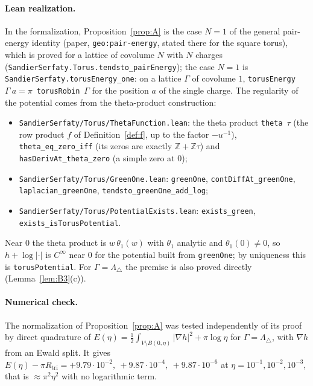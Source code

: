 \documentclass[11pt]{article}
\theoremstyle{definition}
\theoremstyle{remark}
\newcommand{\Z}{\mathbb Z}
\newcommand{\Ltri}{\Lambda_{\triangle}}
\newcommand{\lean}[1]{\texttt{#1}}
\begin{document}
\paragraph{Lean realization.} In the formalization, Proposition~\ref{prop:A} is the case $N=1$ of the general
pair-energy identity (paper, \texttt{geo:pair-energy}, stated there for the square torus), which is proved for a
lattice of covolume $N$ with $N$ charges (\lean{SandierSerfaty.Torus.tendsto\_pairEnergy}); the case $N=1$ is
\lean{SandierSerfaty.torusEnergy\_one}: on a lattice $\Gamma$ of covolume $1$, \lean{torusEnergy}\ $\Gamma\ a=\pi\,$%
\lean{torusRobin}\ $\Gamma$ for the position $a$ of the single charge. The regularity of the potential
comes from the theta-product construction:
\begin{itemize}
\item \lean{SandierSerfaty/Torus/ThetaFunction.lean}: the theta product \lean{theta}\ $\tau$ (the row
product $f$ of Definition~\ref{def:f}, up to the factor $-u^{-1}$), \lean{theta\_eq\_zero\_iff} (its zeros
are exactly $\Z+\Z\tau$) and \lean{hasDerivAt\_theta\_zero} (a simple zero at $0$);
\item \lean{SandierSerfaty/Torus/GreenOne.lean}: \lean{greenOne}, \lean{contDiffAt\_greenOne},
\lean{laplacian\_greenOne}, \lean{tendsto\_greenOne\_add\_log};
\item \lean{SandierSerfaty/Torus/PotentialExists.lean}: \lean{exists\_green},
\lean{exists\_isTorusPotential}.
\end{itemize}
Near $0$ the theta product is $w\,\theta_1(w)$ with $\theta_1$ analytic and $\theta_1(0)\ne0$, so $h+\log|\cdot|$ is
$C^\infty$ near $0$ for the potential built from \lean{greenOne}; by uniqueness this is
\lean{torusPotential}. For $\Gamma=\Ltri$ the premise is also proved directly (Lemma~\ref{lem:B3}(c)).

\paragraph{Numerical check.} The normalization of Proposition~\ref{prop:A} was
tested independently of its proof by direct quadrature of
$E(\eta)=\tfrac12\int_{V\setminus B(0,\eta)}|\nabla h|^2+\pi\log\eta$ for $\Gamma=\Ltri$, with $\nabla h$ from an
Ewald split. It gives $E(\eta)-\pi R_{\mathrm{tri}}=
+9.79\cdot10^{-2},\ +9.87\cdot10^{-4},\ +9.87\cdot10^{-6}$ at $\eta=10^{-1},10^{-2},10^{-3}$, that is
$\approx\pi^2\eta^2$ with no logarithmic term.
\end{document}
